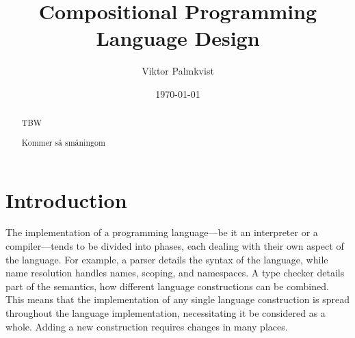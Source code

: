 \documentclass{kththesis}
\title{Compositional Programming Language Design}
\author{Viktor Palmkvist}
\date{\today}
\begin{document}
\frontmatter

\titlepage

\begin{abstract}
TBW
\end{abstract}


\begin{otherlanguage}{swedish}
\begin{abstract}
Kommer så småningom
\end{abstract}
\end{otherlanguage}


\tableofcontents


\mainmatter




\chapter{Introduction} \label{sec:introduction}

The implementation of a programming language---be it an interpreter or a compiler---tends to be divided into phases, each dealing with their own aspect of the language. For example, a parser details the syntax of the language, while name resolution handles names, scoping, and namespaces. A type checker details part of the semantics, how different language constructions can be combined. This means that the implementation of any single language construction is spread throughout the language implementation, necessitating it be considered as a whole. Adding a new construction requires changes in many places.
\end{document}
